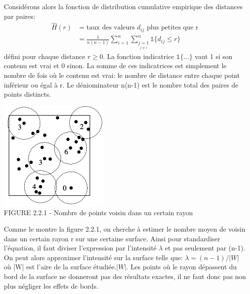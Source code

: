\documentclass[french,12pt,a4paper]{report}
\begin{document}
Considérons alors la fonction de distribution cumulative empirique des distances par paires:
\begin{align*}
\hat{H}(r) &= \text{taux des valeurs } d_{ij} \text{ plus petites que r } \\
        &= \frac{1}{n(n-1)} \sum_{i=1}^n \sum_{\underset{j \neq i}{j=1}}^n \mathds{1} \{d_{ij} \leq r \}
\end{align*}
défini pour chaque distance \begin{math} r \geq 0 \end{math}. La fonction indicatrice  \begin{math} \mathds{1} \{...\}\end{math} vaut 1 si son contenu est vrai et 0 sinon. La somme de ces indicatrices est simplement le nombre de fois où le contenu est vrai: le nombre de distance entre chaque point inférieur ou égal à r. Le déniominateur n(n-1) est le nombre total des paires de points distincts.\\

\begin{minipage}[c]{0.45\linewidth}
\includegraphics[scale=0.9]{images/nombreVoisins.png}\\
\small{FIGURE 2.2.1 - Nombre de points voisin dans un certain rayon}
\end{minipage}
\hfill
\begin{minipage}[c]{0.45\linewidth}
Comme le montre la figure 2.2.1, on cherche à estimer le nombre moyen de voisin dans un certain rayon r sur une certaine surface. Ainsi pour standardiser l'équation, il faut diviser l'expression par l'intensité \begin{math}\lambda \end{math} et pas seulement par (n-1). On peut alors approximer l'intensité sur la surface telle que: \begin{math}\lambda = (n-1)/|W|\end{math} où |W| est l'aire de la surface étudiée.\begin{math}|W|\end{math}. Les points où le rayon dépassent du bord de la surface ne donneront pas des résultats exactes, il ne faut donc pas non plus négliger les effets de bords.
\end{minipage}\\
\end{document}
